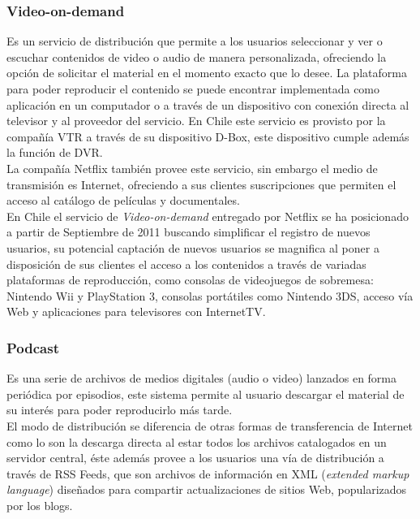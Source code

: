 \subsubsection{Video-on-demand}
Es un servicio de distribución que permite a los usuarios seleccionar y ver o escuchar contenidos de video o audio de manera personalizada, ofreciendo la opción de solicitar el material en el momento exacto que lo desee.  La plataforma para poder reproducir el contenido se puede encontrar implementada como aplicación en un computador o a través de un dispositivo con conexión directa al televisor y al proveedor del servicio. En Chile este servicio es provisto por la compañía VTR a través de su dispositivo D-Box, este dispositivo cumple además la función de DVR.\\

\enlargethispage{2\baselineskip}
La compañía Netflix también provee este servicio, sin embargo el medio de transmisión es Internet, ofreciendo a sus clientes suscripciones que permiten el acceso al catálogo de películas y documentales.\\

En Chile el servicio de \textit{Video-on-demand} entregado por Netflix se ha posicionado a partir de Septiembre de 2011 buscando simplificar el registro de nuevos usuarios, su potencial captación de nuevos usuarios se magnifica al poner a disposición de sus clientes el acceso a los contenidos a través de variadas plataformas de reproducción, como consolas de videojuegos de sobremesa: Nintendo Wii y PlayStation 3, consolas portátiles como Nintendo 3DS, acceso vía Web y aplicaciones para televisores con InternetTV. \\

\subsubsection{Podcast}
Es una serie de archivos de medios digitales (audio o video) lanzados en forma periódica por episodios, este sistema permite al usuario descargar el material de su interés para poder reproducirlo más tarde.\\

El modo de distribución se diferencia de otras formas de transferencia de Internet como lo son la descarga directa al estar todos los archivos catalogados en un servidor central, éste además provee a los usuarios una vía de distribución a través de RSS Feeds, que son archivos de información en XML (\textit{extended markup language}) diseñados para compartir actualizaciones de sitios Web, popularizados por los blogs.\\ 

